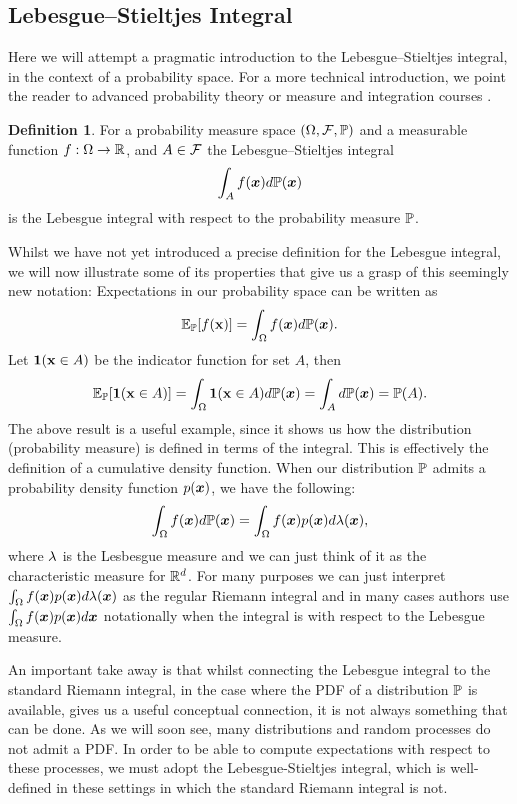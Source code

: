 \documentclass[a4paper,12pt,twoside,openright]{report}
\theoremstyle{definition}
\newtheorem{definition}{Definition}[section]
\begin{document}
\subsection{Lebesgue–Stieltjes Integral}
Here we will attempt a pragmatic introduction to the Lebesgue–Stieltjes integral, in the context of a probability space. For a more technical introduction, we point the reader to advanced probability theory or measure and integration courses \citep{ethmeasure,mitmeasure,cambprob}.
\begin{definition}\label{def:lebesgue}
For a probability measure space $\probspace$ and a measurable function $f: \Omega \rightarrow \R $, and $A \in \calF$ the Lebesgue–Stieltjes integral
\begin{align}
    \int_{A} f(\vx) d\P(\vx)
\end{align}
is the Lebesgue integral with respect to the probability measure $\P$.
\end{definition}
Whilst we have not yet introduced a precise definition for the Lebesgue integral, we will now illustrate some of its properties that give us a grasp of this seemingly new notation:
Expectations in our probability space can be written as
\begin{align}
     \E_{\P}[f(\rvx)] = \int_{\Omega} f(\vx) d\P(\vx).
\end{align}
Let $\ind(\rvx \in A)$ be the indicator function for set $A$, then
\begin{align}
    \E_{\P}[\ind(\rvx \in A)] = \int_{\Omega} \ind(\rvx \in A) d\P(\vx) = \int_{A} d\P(\vx) = \P(A).
\end{align}
The above result is a useful example, since it shows us how the distribution (probability measure) is defined in terms of the integral. This is effectively  the definition of a cumulative density function.
When our distribution $\P$ admits a probability density function $p(\vx)$, we have the following:
\begin{align}
    \int_{\Omega} f(\vx) d\P(\vx) = \int_{\Omega} f(\vx)p(\vx) d\callambda(\vx),
\end{align}
where $\callambda$ is the Lesbesgue measure and we can just think of it as the characteristic measure for $\R^d$. For many purposes we can just interpret $\int_{\Omega} f(\vx)p(\vx) d\callambda(\vx)$ as the regular Riemann integral and in many cases authors \citep{williams2006gaussian} use $\int_{\Omega} f(\vx)p(\vx) d\vx$ notationally when the integral is with respect to the Lebesgue measure.

An important take away is that whilst connecting the Lebesgue integral to the standard Riemann integral, in the case where the PDF of a distribution $\P$ is available, gives us a useful conceptual connection, it is not always something that can be done. As we will soon see, many distributions and random processes do not admit a PDF. In order to be able to compute expectations with respect to these processes, we must adopt the Lebesgue-Stieltjes integral, which is well-defined in these settings in which the standard Riemann integral is not.
\end{document}
